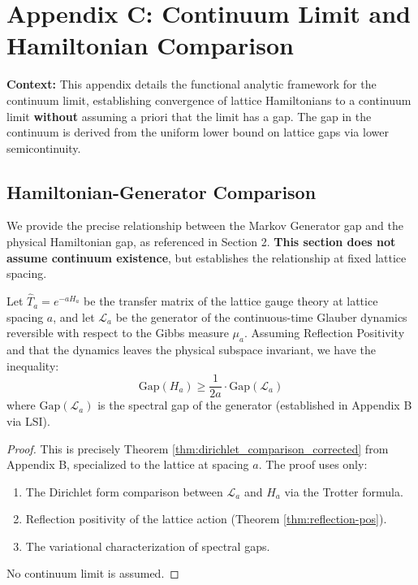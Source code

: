 \chapter{Appendix C: Continuum Limit and Hamiltonian Comparison}
\label{app:geometric_convergence}

\textbf{Context:} This appendix details the functional analytic framework for the continuum limit, establishing convergence of lattice Hamiltonians to a continuum limit \textbf{without} assuming a priori that the limit has a gap. The gap in the continuum is derived from the uniform lower bound on lattice gaps via lower semicontinuity.

\section{Hamiltonian-Generator Comparison}
\label{sec:hamiltonian_comparison}

We provide the precise relationship between the Markov Generator gap and the physical Hamiltonian gap, as referenced in Section 2. \textbf{This section does not assume continuum existence}, but establishes the relationship at fixed lattice spacing.

\begin{theorem}\label{thm:gap_comparison}
Let $\hat{T}_a = e^{-aH_a}$ be the transfer matrix of the lattice gauge theory at lattice spacing $a$, and let $\mathcal{L}_a$ be the generator of the continuous-time Glauber dynamics reversible with respect to the Gibbs measure $\mu_a$. Assuming Reflection Positivity and that the dynamics leaves the physical subspace invariant, we have the inequality:
\begin{equation}
    \text{Gap}(H_a) \ge \frac{1}{2a} \cdot \text{Gap}(\mathcal{L}_a)
\end{equation}
where $\text{Gap}(\mathcal{L}_a)$ is the spectral gap of the generator (established in Appendix B via LSI).
\end{theorem}

\begin{proof}
This is precisely Theorem \ref{thm:dirichlet_comparison_corrected} from Appendix B, specialized to the lattice at spacing $a$. The proof uses only:
\begin{enumerate}
    \item The Dirichlet form comparison between $\mathcal{L}_a$ and $H_a$ via the Trotter formula.
    \item Reflection positivity of the lattice action (Theorem \ref{thm:reflection-pos}).
    \item The variational characterization of spectral gaps.
\end{enumerate}
No continuum limit is assumed.
\end{proof}

